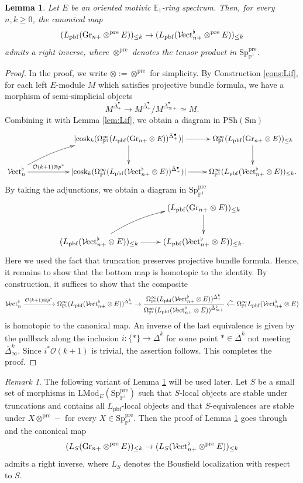 \documentclass{amsart}
\theoremstyle{plain}
\newtheorem{lemma}[theorem]{Lemma}
\theoremstyle{definition}
\theoremstyle{remark}
\newtheorem{remark}[theorem]{Remark}
\numberwithin{equation}{theorem}
\newcommand{\mcal}[1]{\mathcal{#1}}
\newcommand{\mbb}[1]{\mathbb{#1}}
\newcommand{\Gr}{\mathrm{Gr}}
\newcommand{\LMod}{\mathrm{LMod}}
\newcommand{\PSh}{\mathrm{PSh}}
\newcommand{\Sm}{\mathrm{Sm}}
\newcommand{\pbf}{\mathrm{pbf}}
\newcommand{\pre}{\mathrm{pre}}
\newcommand{\OmegaP}{\Omega_{\mathbb{P}^1}}
\newcommand{\SpP}{\mathrm{Sp}_{\mathbb{P}^1}}
\newcommand{\Vect}{{\mathcal{V}\mspace{-2.0mu}\mathrm{ect}}}
\newcommand{\cosk}{\operatorname{cosk}}
\begin{document}
\begin{lemma}\label{lem:Lif2}
Let $E$ be an oriented motivic $\mbb{E}_1$-ring spectrum.
Then, for every $n,k\ge 0$, the canonical map
\[
	(L_\pbf(\Gr_{n+}\otimes^\pre E))_{\le k} \to (L_\pbf(\Vect_{n+}^\flat\otimes^\pre E))_{\le k}
\]
admits a right inverse, where $\otimes^\pre$ denotes the tensor product in $\SpP^\pre$.
\end{lemma}
\begin{proof}
In the proof, we write $\otimes:=\otimes^\pre$ for simplicity.
By Construction \ref{cons:Lif}, for each left $E$-module $M$ which satisfies projective bundle formula, we have a morphism of semi-simplicial objects
\[
	M^{\bar{\Delta}^\bullet_+} \to M^{\bar{\Delta}^\bullet_+}/M^{\bar{\Delta}^\bullet_{\infty+}} \simeq M.
\]
Combining it with Lemma \ref{lem:Lif}, we obtain a diagram in $\PSh(\Sm)$
\[
\xymatrix{
	& & \lvert\cosk_k(\OmegaP^\infty(L_\pbf(\Gr_{n+}\otimes E))^{\bar{\Delta}^\bullet_+})\rvert \ar[d] \ar[r] &
		\OmegaP^\infty(L_\pbf(\Gr_{n+}\otimes E))_{\le k} \ar[d] \\
	\Vect^\flat_n \ar[rr]^-{\mcal{O}(k+1)\otimes p^*} \ar@/^1pc/[rru] & & 
		\lvert\cosk_k(\OmegaP^\infty(L_\pbf(\Vect^\flat_{n+}\otimes E))^{\bar{\Delta}^\bullet_+})\rvert \ar[r] &
			 \OmegaP^\infty(L_\pbf(\Vect^\flat_{n+}\otimes E))_{\le k}.
}
\]
By taking the adjunctions, we obtain a diagram in $\SpP^\pre$
\[
\xymatrix{
	& (L_\pbf(\Gr_{n+}\otimes E))_{\le k} \ar[d] \\
	(L_\pbf(\Vect^\flat_{n+}\otimes E))_{\le k} \ar[r] \ar@/^1pc/[ru] &
		(L_\pbf(\Vect^\flat_{n+}\otimes E))_{\le k}.
}
\]
Here we used the fact that truncation preserves projective bundle formula.
Hence, it remains to show that the bottom map is homotopic to the identity.
By construction, it suffices to show that the composite
\[
	\Vect^\flat_n
		\xrightarrow{\mcal{O}(k+1)\otimes p^*} \OmegaP^\infty(L_\pbf(\Vect^\flat_{n+}\otimes E))^{\bar{\Delta}^k_+}
		\to \frac{\OmegaP^\infty(L_\pbf(\Vect^\flat_{n+}\otimes E))^{\bar{\Delta}^k_+}}
			{\OmegaP^\infty(L_\pbf(\Vect^\flat_{n+}\otimes E))^{\bar{\Delta}^k_{\infty+}}}
		\xleftarrow{\sim} \OmegaP^\infty L_\pbf(\Vect^\flat_{n+}\otimes E)
\]
is homotopic to the canonical map.
An inverse of the last equivalence is given by the pullback along the inclusion $i\colon\{*\}\to\bar{\Delta}^k$ for some point $*\in\bar{\Delta}^k$ not meeting $\bar{\Delta}^k_\infty$.
Since $i^*\mcal{O}(k+1)$ is trivial, the assertion follows.
This completes the proof.
\end{proof}

\begin{remark}\label{rem:Lif}
The following variant of Lemma \ref{lem:Lif2} will be used later.
Let $S$ be a small set of morphisms in $\LMod_E(\SpP^\pre)$ such that $S$-local objects are stable under truncations and contains all $L_\pbf$-local objects and that $S$-equivalences are stable under $X\otimes^\pre-$ for every $X\in\SpP^\pre$.
Then the proof of Lemma \ref{lem:Lif2} goes through and the canonical map
\[
	(L_S(\Gr_{n+}\otimes^\pre E))_{\le k} \to (L_S(\Vect_{n+}^\flat\otimes^\pre E))_{\le k}
\]
admits a right inverse, where $L_S$ denotes the Bousfield localization with respect to $S$.
\end{remark}
\end{document}
